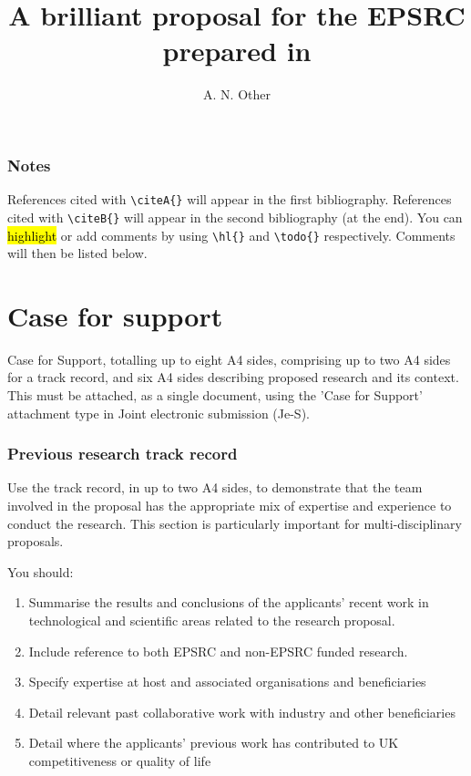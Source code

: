 \documentclass{epsrc}
\begin{document}
\section{Notes}
References cited with \verb|\citeA{}| will appear in the first bibliography.
References cited with \verb|\citeB{}| will appear in the second bibliography (at the end).
You can \hl{highlight} or add comments  by using \verb|\hl{}| and \verb|\todo{}| respectively.
Comments will then be listed below.


\listoftodos%
\newpage%


\title{A brilliant proposal for the EPSRC prepared in \LaTeXe}
\author{A. N. Other}
\maketitle

\part{Case for support}

Case for Support, totalling up to eight A4 sides, comprising up to two A4 sides for a track record, and six A4 sides describing proposed research and its context. This must be attached, as a single document, using the 'Case for Support' attachment type in Joint electronic submission (Je-S).


\section{Previous research track record}

Use the track record, in up to two A4 sides, to demonstrate that the team involved in the proposal has the appropriate mix of expertise and experience to conduct the research. This section is particularly important for multi-disciplinary proposals.

You should:
\begin{enumerate}[label=\roman*.]
	\item Summarise the results and conclusions of the applicants' recent work in technological and scientific areas related to the research proposal.
	\item Include reference to both EPSRC and non-EPSRC funded research.
	\item Specify expertise at host and associated organisations and beneficiaries
	\item Detail relevant past collaborative work with industry and other beneficiaries
	\item Detail where the applicants' previous work has contributed to UK competitiveness or quality of life

\end{enumerate}
\end{document}
